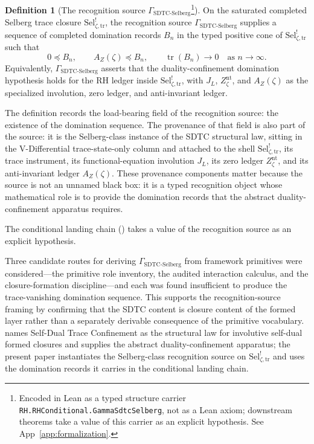 \documentclass[11pt]{article}
\DeclareMathOperator{\trace}{tr}
\newcommand{\JL}{J_{L}}
\newcommand{\Znt}{Z_{\zeta}^{\mathrm{nt}}}
\newcommand{\AZ}{A_{Z}(\zeta)}
\newcommand{\Sel}{\mathrm{Sel}^{!}_{\zeta,\mathrm{tr}}}
\newcommand{\GamSDTCSelberg}{\Gamma_{\mathrm{SDTC\text{-}Selberg}}}
\theoremstyle{definition}
\newtheorem{definition}[theorem]{Definition}
\begin{document}
\begin{definition}[The recognition source \(\GamSDTCSelberg\)\footnote{Encoded in Lean as a typed structure carrier \nolinkurl{RH.RHConditional.GammaSdtcSelberg}, not as a Lean axiom; downstream theorems take a value of this carrier as an explicit hypothesis. See App~\ref{app:formalization}.}]
\label{obl:rh:gamma-sdtc-selberg}
On the saturated completed Selberg trace closure \(\Sel\), the
recognition source \(\GamSDTCSelberg\) supplies a sequence of
completed domination records \(B_n\) in the typed positive cone of
\(\Sel\) such that
\[
  0\preceq B_n,\qquad
  \AZ\preceq B_n,\qquad
  \trace(B_n)\to 0
  \quad\text{as } n\to\infty.
\]
Equivalently, \(\GamSDTCSelberg\) asserts that the
duality-confinement domination hypothesis holds for the RH ledger
inside \(\Sel\), with \(\JL\), \(\Znt\), and \(\AZ\) as the
specialized involution, zero ledger, and anti-invariant ledger.
\end{definition}

The definition records the load-bearing field of the recognition
source: the existence of the domination sequence.  The provenance of
that field is also part of the source: it is the Selberg-class
instance of the SDTC structural law, sitting in the V-Differential
trace-state-only column and attached to the shell \(\Sel\), its
trace instrument, its functional-equation involution \(\JL\), its
zero ledger \(\Znt\), and its anti-invariant ledger \(\AZ\).  These
provenance components matter because the source is not an unnamed
black box: it is a typed recognition object whose mathematical role
is to provide the domination records that the abstract
duality-confinement apparatus requires.

The conditional landing chain () takes a
value of the recognition source as an explicit hypothesis.

Three candidate routes for deriving \(\GamSDTCSelberg\) from
framework primitives were considered---the primitive role inventory,
the audited interaction calculus, and the closure-formation
discipline---and each was found insufficient to produce the
trace-vanishing domination sequence.  This supports the
recognition-source framing by confirming that the SDTC content is
closure content of the formed layer rather than a separately derivable
consequence of the primitive vocabulary.
\citet{TsiokosSDTC2026} names Self-Dual Trace Confinement as the
structural law for involutive self-dual formed closures and supplies
the abstract duality-confinement apparatus; the present paper
instantiates the Selberg-class recognition source on \(\Sel\) and
uses the domination records it carries in the conditional landing
chain.
\end{document}
